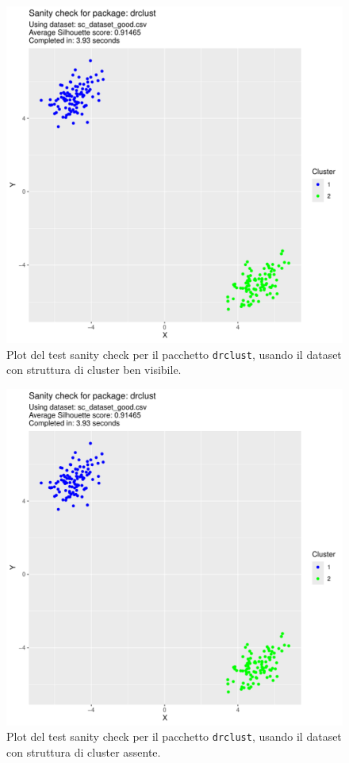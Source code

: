 \documentclass[italian]{article}
\begin{document}
			\begin{figure}[h]
				\includegraphics[width = \textwidth, page = 1]{results/results_DRCLUST.pdf}
				\caption{Plot del test sanity check per il pacchetto \texttt{drclust},
				usando il dataset con struttura di cluster ben visibile.}
				\label{fig:drclustgood}
			\end{figure}

			\begin{figure}[h]
				\includegraphics[width = \textwidth, page = 2]{results/results_DRCLUST.pdf}
				\caption{Plot del test sanity check per il pacchetto \texttt{drclust},
				usando il dataset con struttura di cluster assente.}
				\label{fig:drclustbad}
			\end{figure}
\end{document}
